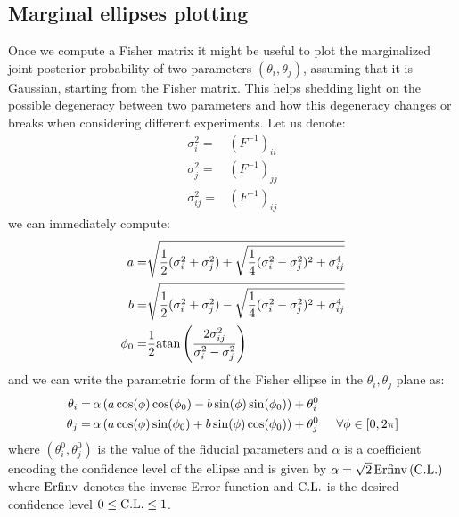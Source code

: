 \documentclass[prd,nofootinbib,showpacs]{revtex4}
\begin{document}
\subsection{Marginal ellipses plotting}
%
Once we compute a Fisher matrix it might be useful to plot the marginalized joint posterior probability of two parameters $(\theta_i, \theta_j)$, assuming that it is Gaussian, starting from the Fisher matrix. This helps shedding light on the possible degeneracy between two parameters and how this degeneracy changes or breaks when considering different experiments.
%
Let us denote:
%
\begin{align}
\sigma_{i}^2 =& \left( F^{-1} \right)_{ii} \nonumber \\ 
\sigma_{j}^2 =& \left( F^{-1} \right)_{jj} \nonumber \\ 
\sigma_{ij}^2 =& \left( F^{-1} \right)_{ij}
\end{align}
%
we can immediately compute:
%
\begin{align}
a =& \sqrt{ \frac{1}{2}( \sigma_{i}^2 + \sigma_{j}^2 ) + \sqrt{ \frac{1}{4} ( \sigma_{i}^2 - \sigma_{j}^2 )^2 + \sigma_{ij}^4 }  } \nonumber \\
b =& \sqrt{ \frac{1}{2}( \sigma_{i}^2 + \sigma_{j}^2 ) - \sqrt{ \frac{1}{4} ( \sigma_{i}^2 - \sigma_{j}^2 )^2 + \sigma_{ij}^4 }  }  \nonumber \\
\phi_0 =& \frac{1}{2} {\rm atan} \left( \frac{ 2 \sigma_{ij}^2 }{ \sigma_{i}^2 - \sigma_{j}^2} \right) 
\end{align}
%
and we can write the parametric form of the Fisher ellipse in the $\theta_i, \theta_j$ plane as:
%
\begin{align}
\theta_i =& \, \alpha \left( a \cos(\phi)\cos(\phi_0) - b \sin(\phi)\sin(\phi_0) \right) + \theta_i^0 \nonumber \\
\theta_j =& \, \alpha \left( a \cos(\phi)\sin(\phi_0) + b \sin(\phi)\cos(\phi_0) \right) + \theta_j^0 \hspace{0.5cm} \forall \phi \in [0,2\pi]
\end{align}
%
where $(\theta_i^0, \theta_j^0)$ is the value of the fiducial parameters and $\alpha$ is a coefficient encoding the confidence level of the ellipse and is given by $\alpha=\sqrt{2} \, {\rm Erfinv}\left( {\rm C.L.} \right)$ where ${\rm Erfinv}$ denotes the inverse Error function and ${\rm C.L.}$ is the desired confidence level $0\leq {\rm C.L.} \leq 1$.

%
\end{document}
